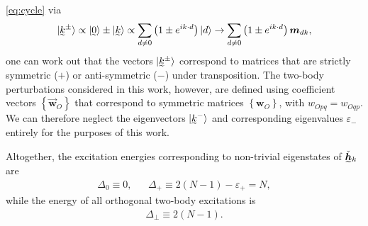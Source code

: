 \documentclass[nofootinbib,notitlepage,11pt]{revtex4-2}
\newcommand{\p}[1]{\left(#1\right)} %
\renewcommand{\set}[1]{\left\{#1\right\}} %
\renewcommand{\c}{\cdot} %
\newcommand{\m}{\bm} %
\renewcommand{\v}{\vec} %
\newcommand{\1}{\mathds{1}}
\newcommand{\ut}{\undertilde}
\begin{document}
\eqref{eq:cycle} via
\begin{align}
  \ket{\ut{k}^\pm}
  \propto \ket{\ut{0}} \pm \ket{\ut{k}}
  \propto \sum_{d\ne0} \p{1 \pm e^{ik\c d}} \ket{d}
  \to \sum_{d\ne0} \p{1 \pm e^{ik\c d}} \m m_{dk},
\end{align}
one can work out that the vectors $\ket{\ut{k}^\pm}$ correspond to
matrices that are strictly symmetric ($+$) or anti-symmetric ($-$)
under transposition.  The two-body perturbations considered in this
work, however, are defined using coefficient vectors
$\set{\v{\m w}_O}$ that correspond to symmetric matrices
$\set{\m w_O}$, with $w_{Opq}=w_{Oqp}$.  We can therefore neglect the
eigenvectors $\ket{\ut{k}^-}$ and corresponding eigenvalues
$\varepsilon_-$ entirely for the purposes of this work.

Altogether, the excitation energies corresponding to non-trivial
eigenstates of $\ut{\check{\m h}}_k$ are
\begin{align}
  \Delta_0 \equiv 0,
  &&
  \Delta_+ \equiv 2\p{N-1} - \varepsilon_+ = N,
\end{align}
while the energy of all orthogonal two-body excitations is
\begin{align}
  \Delta_\perp \equiv 2\p{N-1}.
\end{align}


\end{document}
